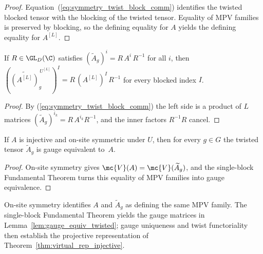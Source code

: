 \begin{proof}\leanok
    Equation~(\ref{eq:symmetry_twist_block_comm}) identifies the twisted
    blocked tensor with the blocking of the twisted tensor.  Equality of MPV
    families is preserved by blocking, so the defining equality for $A$
    yields the defining equality for $A^{[L]}$.
\end{proof}

\begin{lemma}
    \label{lem:twisted_tensor_block_gauge}
    \leanok
    If $R\in\GL_{D}(\C)$ satisfies $(\widetilde A_g)^i=R\,A^i\,R^{-1}$ for all
    $i$, then $(\widetilde{(A^{[L]})}^{\,U^{[L]}}_g)^I=R\,(A^{[L]})^I\,R^{-1}$
    for every blocked index $I$.
\end{lemma}

\begin{proof}\leanok
    By (\ref{eq:symmetry_twist_block_comm}) the left side is a product of $L$
    matrices $(\widetilde A_g)^{i_k}=R\,A^{i_k}R^{-1}$, and the inner factors
    $R^{-1}R$ cancel.
\end{proof}

\begin{lemma}%
    \label{lem:gauge_equiv_twisted}
    \leanok
    If $A$ is injective and on-site symmetric under $U$, then
    for every $g \in G$ the twisted tensor $\widetilde{A}_g$ is
    gauge equivalent to~$A$.
\end{lemma}

\begin{proof}\leanok{}
    On-site symmetry gives
    $\mc{V}(A)=\mc{V}(\widetilde{A}_g)$, and the single-block
    Fundamental Theorem turns this equality of MPV families into gauge
    equivalence.
\end{proof}

\begin{remark}%
    \label{rem:injective_symmetry_ft_route}
    On-site symmetry identifies $A$ and $\widetilde{A}_g$ as defining the same MPV
    family. The single-block Fundamental Theorem yields the gauge matrices in
    Lemma~\ref{lem:gauge_equiv_twisted}; gauge uniqueness and twist functoriality
    then establish the projective representation of
    Theorem~\ref{thm:virtual_rep_injective}.
\end{remark}

